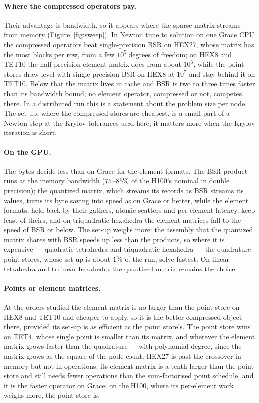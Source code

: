 \documentclass[sigconf,balance=false]{acmart}
\begin{document}
\paragraph{Where the compressed operators pay.}  Their advantage is bandwidth, so it appears
where the sparse matrix streams from memory (Figure~\ref{fig:sweep}).  In Newton time to solution
on one Grace CPU the compressed operators beat single-precision BSR on HEX27, whose matrix has the
most blocks per row, from a few $10^5$ degrees of freedom; on HEX8 and TET10 the half-precision
element matrix does from about $10^6$, while the point stores draw level with single-precision BSR
on HEX8 at $10^7$ and stay behind it on TET10.  Below that the matrix lives in cache and BSR is
two to three times faster than its bandwidth bound; no element operator, compressed or not,
competes there.  In a distributed run this is a statement about the problem size per node.  The
set-up, where the compressed stores are cheapest, is a small part of a Newton step at the Krylov
tolerances used here; it matters more when the Krylov iteration is short.

\paragraph{On the GPU.}  The bytes decide less than on Grace for the element formats.  The BSR
product runs at the memory bandwidth ($75$--$85\%$ of the
H100's nominal in double precision); the quantized matrix, which streams its records as BSR
streams its values, turns its byte saving into speed as on Grace or better, while the element
formats, held back by their gathers, atomic scatters and per-element latency, keep least of theirs,
and on triquadratic hexahedra the element matrices fall to the speed of BSR or below.  The set-up weighs more: the
assembly that the quantized matrix shares with BSR speeds up less than the products, so where it is
expensive --- quadratic tetrahedra and triquadratic hexahedra --- the quadrature-point stores, whose
set-up is about $1\%$ of the run, solve fastest.  On linear tetrahedra and
trilinear hexahedra the quantized matrix remains the choice.


\paragraph{Points or element matrices.}  At the orders studied the element matrix is no larger than
the point store on HEX8 and TET10 and cheaper to apply, so it is the better compressed
object there, provided its set-up is as efficient as the point store's.  The point store wins on
TET4, whose single point is smaller than its matrix, and wherever the element matrix grows faster
than the quadrature --- with polynomial degree, since the matrix grows as the square of the node
count.  HEX27 is past the crossover in memory but not in operations: its element matrix is a tenth
larger than the point store and still needs fewer operations than the sum-factorised point schedule,
and it is the faster operator on Grace; on the H100, where its per-element work weighs more, the
point store is.
\end{document}
